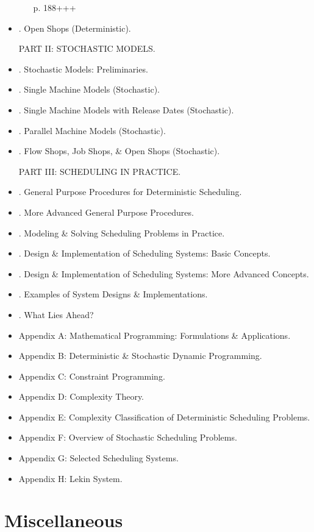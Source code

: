 \documentclass{article}
\begin{document}
\begin{itemize}
\begin{itemize}
        p. 188+++
    \end{itemize}

    \item {. Open Shops (Deterministic).}

    PART II: STOCHASTIC MODELS.
    \item {. Stochastic Models: Preliminaries.}
    \item {. Single Machine Models (Stochastic).}
    \item {. Single Machine Models with Release Dates (Stochastic).}
    \item {. Parallel Machine Models (Stochastic).}
    \item {. Flow Shops, Job Shops, \& Open Shops (Stochastic).}

    PART III: SCHEDULING IN PRACTICE.
    \item {. General Purpose Procedures for Deterministic Scheduling.}
    \item {. More Advanced General Purpose Procedures.}
    \item {. Modeling \& Solving Scheduling Problems in Practice.}
    \item {. Design \& Implementation of Scheduling Systems: Basic Concepts.}
    \item {. Design \& Implementation of Scheduling Systems: More Advanced Concepts.}
    \item {. Examples of System Designs \& Implementations.}
    \item {. What Lies Ahead?}
    \item {\sf Appendix A: Mathematical Programming: Formulations \& Applications.}
    \item {\sf Appendix B: Deterministic \& Stochastic Dynamic Programming.}
    \item {\sf Appendix C: Constraint Programming.}
    \item {\sf Appendix D: Complexity Theory.}
    \item {\sf Appendix E: Complexity Classification of Deterministic Scheduling Problems.}
    \item {\sf Appendix F: Overview of Stochastic Scheduling Problems.}
    \item {\sf Appendix G: Selected Scheduling Systems.}
    \item {\sf Appendix H: Lekin System.}
\end{itemize}


\section{Miscellaneous}


\printbibliography[heading=bibintoc]
\end{document}
